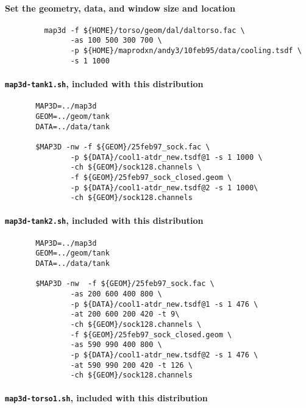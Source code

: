 \paragraph{Set the geometry, data, and window size and location}

\begin{verbatim}
         map3d -f ${HOME}/torso/geom/dal/daltorso.fac \
               -as 100 500 300 700 \
               -p ${HOME}/maprodxn/andy3/10feb95/data/cooling.tsdf \
               -s 1 1000
\end{verbatim}

\paragraph{\texttt{map3d-tank1.sh}, included with this distribution}

\begin{verbatim}
       MAP3D=../map3d
       GEOM=../geom/tank
       DATA=../data/tank

       $MAP3D -nw -f ${GEOM}/25feb97_sock.fac \
               -p ${DATA}/cool1-atdr_new.tsdf@1 -s 1 1000 \
               -ch ${GEOM}/sock128.channels \
               -f ${GEOM}/25feb97_sock_closed.geom \
               -p ${DATA}/cool1-atdr_new.tsdf@2 -s 1 1000\
               -ch ${GEOM}/sock128.channels
\end{verbatim}

\paragraph{\texttt{map3d-tank2.sh}, included with this distribution}

\begin{verbatim}
       MAP3D=../map3d
       GEOM=../geom/tank
       DATA=../data/tank

       $MAP3D -nw  -f ${GEOM}/25feb97_sock.fac \
               -as 200 600 400 800 \
               -p ${DATA}/cool1-atdr_new.tsdf@1 -s 1 476 \
               -at 200 600 200 420 -t 9\
               -ch ${GEOM}/sock128.channels \
               -f ${GEOM}/25feb97_sock_closed.geom \
               -as 590 990 400 800 \
               -p ${DATA}/cool1-atdr_new.tsdf@2 -s 1 476 \
               -at 590 990 200 420 -t 126 \
               -ch ${GEOM}/sock128.channels
\end{verbatim}

\paragraph{\texttt{map3d-torso1.sh}, included with this distribution}

